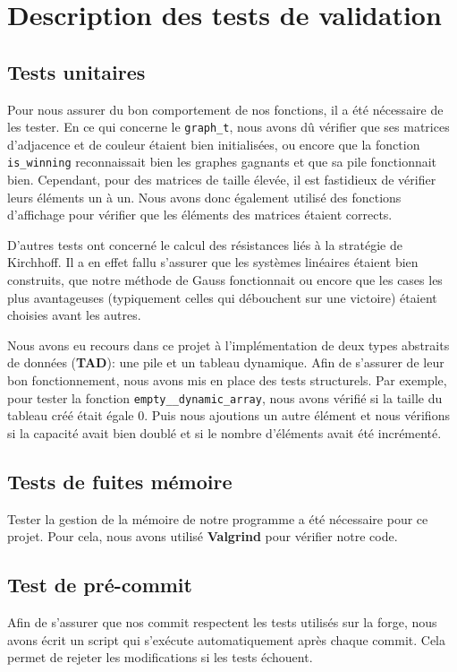 \documentclass{article}
\begin{document}
\section{Description des tests de validation}

\subsection{Tests unitaires}

Pour nous assurer du bon comportement de nos fonctions, il a été nécessaire de les tester. En ce qui concerne le \lstinline{graph_t}, nous avons dû vérifier que ses matrices d'adjacence et de couleur étaient bien initialisées, ou encore que la fonction \lstinline{is_winning} reconnaissait bien les graphes gagnants et que sa pile fonctionnait bien. Cependant, pour des matrices de taille élevée, il est fastidieux de vérifier leurs éléments un à un. Nous avons donc également utilisé des fonctions d'affichage pour vérifier que les éléments des matrices étaient corrects.

D'autres tests ont concerné le calcul des résistances liés à la stratégie de Kirchhoff. Il a en effet fallu s'assurer que les systèmes linéaires étaient bien construits, que notre méthode de Gauss fonctionnait ou encore que les cases les plus avantageuses (typiquement celles qui débouchent sur une victoire) étaient choisies avant les autres.

Nous avons eu recours dans ce projet à l'implémentation de deux types abstraits de données (\textbf{TAD}): une pile et un tableau dynamique. Afin de s'assurer de leur bon fonctionnement, nous avons mis en place des tests structurels. Par exemple, pour tester la fonction \lstinline{empty__dynamic_array}, nous avons vérifié si la taille du tableau créé était égale 0. Puis nous ajoutions un autre élément et nous vérifions si la capacité avait bien doublé et si le nombre d'éléments avait été incrémenté.

\subsection{Tests de fuites mémoire}
Tester la gestion de la mémoire de notre programme a été nécessaire pour ce projet. Pour cela, nous avons utilisé \textbf{Valgrind} pour vérifier notre code.
\subsection{Test de pré-commit}
Afin de s'assurer que nos commit respectent les tests utilisés sur la forge, nous avons écrit un script qui s'exécute automatiquement après chaque commit. Cela permet de rejeter les modifications si les tests échouent. 
\end{document}
